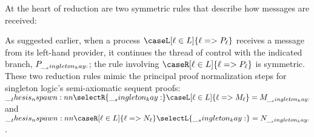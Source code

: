 At the heart of reduction are two symmetric rules that describe how messages are received:
%

As suggested earlier, when a process $\caseL[\ell \in L]{\ell => P_{\ell}}$ receives a message from its left-hand provider, it continues the thread of control with the indicated branch, $P_{\__singleton_kay:}$; the rule involving $\caseR[\ell \in L]{\ell => P_{\ell}}$ is symmetric.
These two reduction rules mimic the principal proof normalization steps for singleton logic's semi-axiomatic sequent proofs: $\nspawn{\selectR{\kay}}{\caseL[\ell \in L]{\ell => M_{\ell}}} = M_{\kay}$ and $\nspawn{\caseR[\ell \in L]{\ell => N_{\ell}}}{\selectL{\kay}} = N_{\kay}$.


